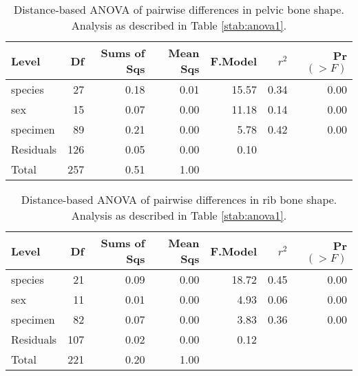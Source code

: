 \begin{table}[ht]
\centering
\begin{tabular}{lrrrrrr}
  \hline
 Level & Df & Sums of Sqs & Mean Sqs & F.Model & $r^2$ & Pr$(>F)$ \\ 
  \hline
  species &  27 & 0.18 & 0.01 & 15.57 & 0.34 & 0.00 \\ 
  sex &  15 & 0.07 & 0.00 & 11.18 & 0.14 & 0.00 \\ 
  specimen &  89 & 0.21 & 0.00 & 5.78 & 0.42 & 0.00 \\ 
  Residuals & 126 & 0.05 & 0.00 & 0.10 &  &  \\ 
  Total & 257 & 0.51 & 1.00 &  &  &  \\ 
   \hline
\end{tabular}
\caption{
Distance-based ANOVA of pairwise differences in pelvic bone shape.  Analysis as described in Table  \ref{stab:anova1}.
}
\end{table}


\begin{table}[ht]
\centering
\begin{tabular}{lrrrrrr}
  \hline
 Level & Df & Sums of Sqs & Mean Sqs & F.Model & $r^2$ & Pr$(>F)$ \\ 
  \hline
  species &  21 & 0.09 & 0.00 & 18.72 & 0.45 & 0.00 \\ 
  sex &  11 & 0.01 & 0.00 & 4.93 & 0.06 & 0.00 \\ 
  specimen &  82 & 0.07 & 0.00 & 3.83 & 0.36 & 0.00 \\ 
  Residuals & 107 & 0.02 & 0.00 & 0.12 &  &  \\ 
  Total & 221 & 0.20 & 1.00 &  &  &  \\ 
   \hline
\end{tabular}
\caption{
Distance-based ANOVA of pairwise differences in rib bone shape.  Analysis as described in Table  \ref{stab:anova1}.
}
\end{table}

